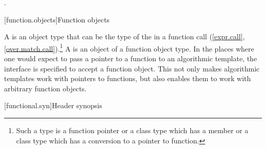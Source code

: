 \begin{itemdescr}
\pnum
\returns {}.
\end{itemdescr}

[function.objects]{Function objects}

\pnum
A  is an object
type that can be the type of the
 in a function call
(\ref{expr.call}, \ref{over.match.call}).\footnote{Such a type is a function
pointer or a class type which has a member  or a class type
which has a conversion to a pointer to function.} A  is an
object of a function object type. In the places where one would expect to pass a
pointer to a function to an algorithmic template, the
interface is specified to accept a function object. This not only makes
algorithmic templates work with pointers to functions, but also enables them to
work with arbitrary function objects.

[functional.syn]{Header  synopsis}

